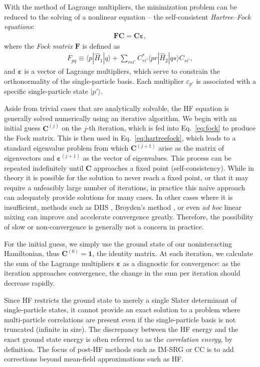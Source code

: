 With the method of Lagrange multipliers, the minimization problem can be reduced to the solving of a nonlinear equation -- the self-consistent \textit{Hartree--Fock equations}:
\begin{align} \label{eq:hartreefock}
  \bm{F} \bm{C} = \bm{C} \bm{\varepsilon},
\end{align}
where the \textit{Fock matrix} $\bm F$ is defined as
\begin{align} \label{eq:fock}
  F_{p q} \equiv \langle p | \hat{H}_1 | q \rangle + \sum_{r s i'} C_{r i'}^* \langle p r | \hat{H}_2 | q s \rangle C_{s i'}^{},
\end{align}
and $\bm{\varepsilon}$ is a vector of Lagrange multipliers, which serve to constrain the orthonormality of the single-particle basis.  Each multiplier $\varepsilon_{p'}$ is associated with a specific single-particle state $|p'\rangle$.

Aside from trivial cases that are analytically solvable, the HF equation is generally solved numerically using an iterative algorithm.  We begin with an initial guess $\bm{C}^{(j)}$ on the $j$-th iteration, which is fed into Eq.\ \eqref{eq:fock} to produce the Fock matrix.  This is then used in Eq.\ \eqref{eq:hartreefock}, which leads to a standard eigenvalue problem from which $\bm{C}^{(j + 1)}$ arise as the matrix of eigenvectors and $\bm{\varepsilon}^{(j + 1)}$ as the vector of eigenvalues.  This process can be repeated indefinitely until $\bm{C}$ approaches a fixed point (self-consistency).  While in theory it is possible for the solution to never reach a fixed point, or that it may require a unfeasibly large number of iterations, in practice this naive approach can adequately provide solutions for many cases.  In other cases where it is insufficient, methods such as DIIS \cite{PULAY1980393,JCC:JCC540030413}, Broyden's method \cite{broyden1965class}, or even \textit{ad hoc} linear mixing can improve and accelerate convergence greatly.  Therefore, the possibility of slow or non-convergence is generally not a concern in practice.

For the initial guess, we simply use the ground state of our noninteracting Hamiltonian, thus $\bm{C}^{(0)} = \bm{1}$, the identity matrix.  At each iteration, we calculate the sum of the Lagrange multipliers $\bm{\varepsilon}$ as a diagnostic for convergence: as the iteration approaches convergence, the change in the sum per iteration should decrease rapidly.

Since HF restricts the ground state to merely a single Slater determinant of single-particle states, it cannot provide an exact solution to a problem where multi-particle correlations are present even if the single-particle basis is not truncated (infinite in size).  The discrepancy between the HF energy and the exact ground state energy is often referred to as the \textit{correlation energy}, by definition.  The focus of post-HF methods such as IM-SRG or CC is to add corrections beyond mean-field approximations such as HF.

